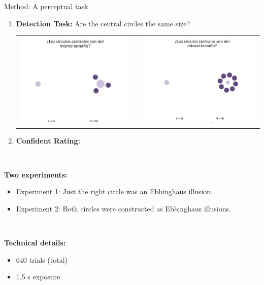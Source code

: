 \documentclass[final]{beamer}
\newlength{\onecolwid}
\begin{document}
\begin{frame}[t]
\begin{columns}[t]
\begin{column}{\onecolwid}
\begin{alertblock}{Method: A perceptual task}
$\quad$
\begin{enumerate}
\item \textbf{Detection Task:} Are the central circles the same size?
\begin{center}
\begin{tabular}{ccc}
\includegraphics[width=0.35\linewidth]{Figures/MainTask.png} & \hfill & \includegraphics[width=0.35\linewidth]{Figures/MainTask2.png}
\end{tabular}
\end{center}
\item \textbf{Confident Rating:}
\end{enumerate}
$\qquad$

\textbf{Two experiments:} 

\begin{itemize}
\item Experiment 1: Just the right circle was an Ebbinghaus illusion.
\item Experiment 2: Both circles were constructed as Ebbinghaus illusions.
\end{itemize}

$\qquad$

\textbf{Technical details:} 

\begin{itemize}
\item 640 trials (total)
\item 1.5 s exposure
\end{itemize}
\end{alertblock}


\end{column}
\end{columns}
\end{frame}
\end{document}
